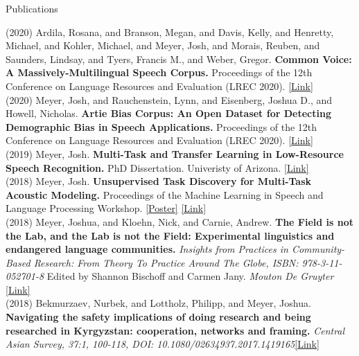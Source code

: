 \documentclass{resume} %
\begin{document}
\begin{minipage}{\textwidth}

\begin{rSection}{Publications}
\vspace{.25cm}

{(2020)} {Ardila, Rosana, and Branson, Megan, and Davis, Kelly, and Henretty, Michael, and Kohler, Michael, and Meyer, Josh, and Morais, Reuben, and Saunders, Lindsay, and Tyers, Francis M., and Weber, Gregor.} {\bf Common Voice: A Massively-Multilingual Speech Corpus.} {Proceedings of the 12th Conference on Language Resources and Evaluation (LREC 2020).} {\href{https://www.aclweb.org/anthology/2020.lrec-1.520.pdf}{[Link]}} \\

{(2020)} {Meyer, Josh, and Rauchenstein, Lynn, and Eisenberg, Joshua D., and Howell, Nicholas.} {\bf Artie Bias Corpus: An Open Dataset for Detecting Demographic Bias in Speech Applications.} {Proceedings of the 12th Conference on Language Resources and Evaluation (LREC 2020).} {\href{https://www.aclweb.org/anthology/2020.lrec-1.796.pdf}{[Link]}} \\

{(2019)} {Meyer, Josh.} {\bf Multi-Task and Transfer Learning in Low-Resource Speech Recognition.} {PhD Dissertation. Univeristy of Arizona.} {\href{http://jrmeyer.github.io/misc/MEYER_dissertation_2019.pdf}{[Link]}} \\

{(2018)} {Meyer, Josh.} {\bf Unsupervised Task Discovery for Multi-Task Acoustic Modeling.} {Proceedings of the Machine Learning in Speech and Language Processing Workshop.} {\href{https://github.com/JRMeyer/mlslp/blob/master/poster/mlslp-poster.pdf}{[Poster]}} {\href{https://sites.google.com/view/mlslp/proceedings}{[Link]}} \\

{(2018)} {Meyer, Joshua, and Kloehn, Nick, and Carnie, Andrew.} {\bf{The Field is not the Lab, and the Lab is not the Field: Experimental linguistics and endangered language communities.}} {{\it Insights from Practices in Community-Based Research: From Theory To Practice Around The Globe, ISBN: 978-3-11-052701-8} Edited by Shannon Bischoff and Carmen Jany. \textit{Mouton De Gruyter}} {\href{https://www.degruyter.com/view/product/481684}{[Link]}}\\

{(2018)} {Bekmurzaev, Nurbek, and Lottholz, Philipp, and Meyer, Joshua.} {\textbf{Navigating the safety implications of doing research and being researched in Kyrgyzstan: cooperation, networks and framing.}} {\textit{Central Asian Survey, 37:1, 100-118, DOI: 10.1080/02634937.2017.1419165}}{\href{https://www.tandfonline.com/doi/abs/10.1080/02634937.2017.1419165}{[Link]}}\\


\end{rSection}
\end{minipage}
\end{document}
